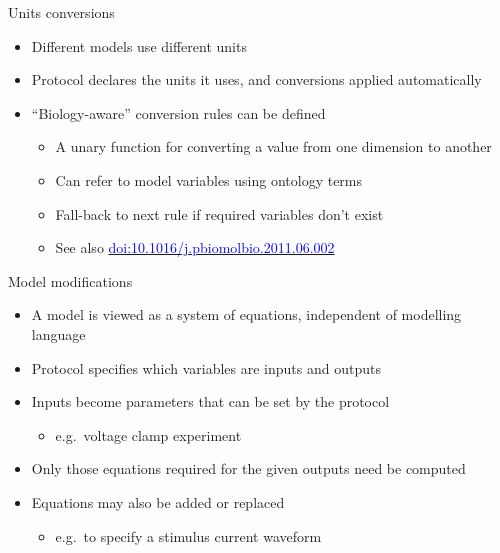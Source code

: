 \documentclass[t,xcolor={usenames,dvipsnames}]{beamer}
\newcommand{\myhref}[2]{\href{#1}{\textcolor{Blue}{#2}}}
\newcommand{\subitem}[1]{\begin{itemize}[<.->]\item #1 \end{itemize}}
\newcommand{\doi}[1]{\myhref{http://dx.doi.org/#1}{doi:#1}}
\begin{document}
\begin{frame}{Units conversions}
\begin{itemize}
\item Different models use different units
\item Protocol declares the units it uses, and conversions applied automatically
\item ``Biology-aware'' conversion rules can be defined
  \begin{itemize}
  \item A unary function for converting a value from one dimension to another
  \item Can refer to model variables using ontology terms
  \item Fall-back to next rule if required variables don't exist
  \item See also \doi{10.1016/j.pbiomolbio.2011.06.002}
  \end{itemize}
\end{itemize}
\end{frame}

\begin{frame}{Model modifications}
\begin{itemize}
\item A model is viewed as a \alert{system of equations}, independent of modelling language
\item<2-> Protocol specifies which variables are \alert{inputs} and \alert{outputs}
\item<2-> Inputs become parameters that can be set by the protocol
  \subitem{e.g.\ voltage clamp experiment}
\item<2-> Only those equations required for the given outputs need be computed
\item<3-> Equations may also be \alert{added or replaced}
  \subitem{e.g.\ to specify a stimulus current waveform}
\end{itemize}
\end{frame}
\end{document}
